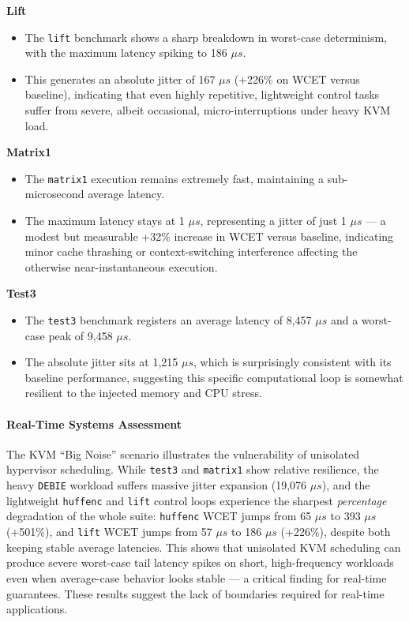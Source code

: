 \textbf{Lift}

\begin{itemize}
\item
  The \texttt{lift} benchmark shows a sharp breakdown in worst-case
  determinism, with the maximum latency spiking to 186 $\mu s$.
\item
  This generates an absolute jitter of 167 $\mu s$ (+226\% on WCET versus
  baseline), indicating that even highly repetitive, lightweight control
  tasks suffer from severe, albeit occasional, micro-interruptions under
  heavy KVM load.
\end{itemize}

\textbf{Matrix1}

\begin{itemize}
\item
  The \texttt{matrix1} execution remains extremely fast, maintaining a
  sub-microsecond average latency.
\item
  The maximum latency stays at 1 $\mu s$, representing a jitter of just 1 $\mu s$
  --- a modest but measurable +32\% increase in WCET versus baseline,
  indicating minor cache thrashing or context-switching interference
  affecting the otherwise near-instantaneous execution.
\end{itemize}

\textbf{Test3}

\begin{itemize}
\item
  The \texttt{test3} benchmark registers an average latency of 8,457 $\mu s$
  and a worst-case peak of 9,458 $\mu s$.
\item
  The absolute jitter sits at 1,215 $\mu s$, which is surprisingly consistent
  with its baseline performance, suggesting this specific computational
  loop is somewhat resilient to the injected memory and CPU stress.
\end{itemize}

\paragraph{Real-Time Systems
Assessment}\label{real-time-systems-assessment-2}

The KVM ``Big Noise'' scenario illustrates the vulnerability of
unisolated hypervisor scheduling. While \texttt{test3} and
\texttt{matrix1} show relative resilience, the heavy \texttt{DEBIE}
workload suffers massive jitter expansion (19,076 $\mu s$), and the
lightweight \texttt{huffenc} and \texttt{lift} control loops experience
the sharpest \emph{percentage} degradation of the whole suite:
\texttt{huffenc} WCET jumps from 65 $\mu s$ to 393 $\mu s$ (+501\%), and
\texttt{lift} WCET jumps from 57 $\mu s$ to 186 $\mu s$ (+226\%), despite both
keeping stable average latencies. This shows that unisolated KVM
scheduling can produce severe worst-case tail latency spikes on short,
high-frequency workloads even when average-case behavior looks stable
--- a critical finding for real-time guarantees. These results suggest
the lack of boundaries required for real-time applications.

